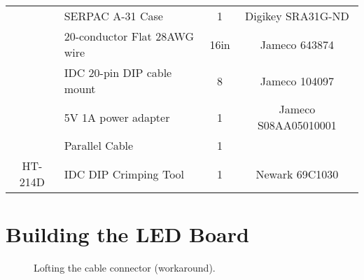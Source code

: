 \documentclass[11pt]{article}
\begin{document}
\begin{tabular}{|c|l|c|c|}
\hline
\hline
          & SERPAC A-31 Case           & 1   & Digikey SRA31G-ND \\ %
	  & 20-conductor Flat 28AWG wire & 16in & Jameco 643874 \\ %
          & IDC 20-pin DIP cable mount & 8   & Jameco 104097 \\ %
	  & 5V 1A power adapter        & 1   & Jameco S08AA05010001 \\ %
	  & Parallel Cable             & 1   & \\
HT-214D   & IDC DIP Crimping Tool      & 1   & Newark 69C1030 \\ %
\hline

\end{tabular}


\section{Building the LED Board}

\begin{figure*}[tbp]
\begin{center}
\caption{Lofting the cable connector (workaround).}
\label{figure:cableloft}
\end{center}
\end{figure*}
\end{document}
